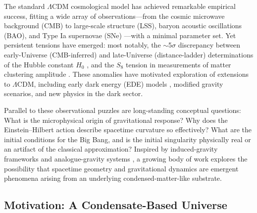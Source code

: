 \documentclass[11pt,a4paper]{article}
\theoremstyle{definition}
\begin{document}
The standard $\Lambda$CDM cosmological model has achieved remarkable empirical success, fitting a wide array of observations---from the cosmic microwave background (CMB) \cite{Planck2018} to large-scale structure (LSS), baryon acoustic oscillations (BAO), and Type Ia supernovae (SNe) \cite{RiessReview2024}---with a minimal parameter set. Yet persistent tensions have emerged: most notably, the $\sim$5$\sigma$ discrepancy between early-Universe (CMB-inferred) and late-Universe (distance-ladder) determinations of the Hubble constant $H_0$ \cite{RiessReview2024,EDEReview2023}, and the $S_8$ tension in measurements of matter clustering amplitude \cite{PlanckS8,DES2021}. These anomalies have motivated exploration of extensions to $\Lambda$CDM, including early dark energy (EDE) models \cite{PoulinReview2023,EDEReview2023}, modified gravity scenarios, and new physics in the dark sector.

Parallel to these observational puzzles are long-standing conceptual questions: What is the microphysical origin of gravitational response? Why does the Einstein--Hilbert action describe spacetime curvature so effectively? What are the initial conditions for the Big Bang, and is the initial singularity physically real or an artifact of the classical approximation? Inspired by induced-gravity frameworks \cite{Sakharov,Vassilevich} and analogue-gravity systems \cite{AnalogueGravityReview}, a growing body of work explores the possibility that spacetime geometry and gravitational dynamics are emergent phenomena arising from an underlying condensed-matter-like substrate.

\subsection{Motivation: A Condensate-Based Universe}
\label{sec:motivation}
\end{document}
